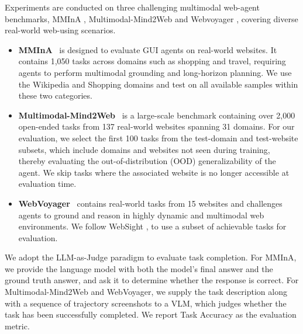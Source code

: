 \documentclass{article} %
\begin{document}
Experiments are conducted on three challenging multimodal web-agent benchmarks, MMInA \citep{zhang2024mmina}, Multimodal-Mind2Web \citep{mind2web, zheng2024seeact_multimodal_mind2web} and Webvoyager \citep{he2024webvoyager}, covering diverse real-world web-using scenarios.

\begin{itemize}
    \item[(i)] \textbf{MMInA}~\citep{zhang2024mmina} is designed to evaluate GUI agents on real-world websites. It contains 1,050 tasks across domains such as shopping and travel, requiring agents to perform  multimodal grounding and long-horizon planning. We use the Wikipedia and Shopping domains and test on all available samples within these two categories.

\item[(i)] \textbf{Multimodal-Mind2Web}~\citep{mind2web, zheng2024seeact_multimodal_mind2web} is a large-scale benchmark containing over 2,000 open-ended tasks from 137 real-world websites spanning 31 domains. For our evaluation, we select the first 100 tasks from the test-domain and test-website subsets, which include domains and websites not seen during training, thereby evaluating the out-of-distribution (OOD) generalizability of the agent. We skip tasks where the associated website is no longer accessible at evaluation time.

\item[(i)] \textbf{WebVoyager}~\citep{he2024webvoyager} contains real-world tasks from 15 websites and challenges agents to ground and reason in highly dynamic and multimodal web environments. We follow WebSight \citep{bhathal2025websight}, to use a subset of achievable tasks for evaluation.
\end{itemize}


We adopt the LLM-as-Judge paradigm \citep{he2024webvoyager} to evaluate task completion. For MMInA, we provide the language model with both the model’s final answer and the ground truth answer, and ask it to determine whether the response is correct. For Multimodal-Mind2Web and WebVoyager, we supply the task description along with a sequence of trajectory screenshots to a VLM, which judges whether the task has been successfully completed. We report Task Accuracy as the evaluation metric.
\end{document}

